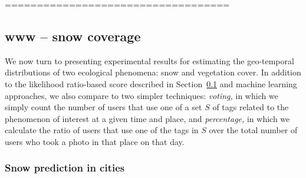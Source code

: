 
\hfill \break
\hfill \break
===================================
\hfill \break
\hfill \break
\subsection{www -- snow coverage}

\label{sec:results}

We now turn to presenting experimental results for estimating the
geo-temporal distributions of two ecological phenomena: snow and vegetation cover.
In addition to the likelihood ratio-based score described in
Section~\ref{sec:results} and machine learning approaches, we also
compare to two simpler techniques: \textit{voting,} in which 
we simply count the number of users that use one of a set
$S$ of tags related to the phenomenon of interest at a given time and place, and
\textit{percentage,} in which we calculate the ratio of users that use
one of the tags in $S$ over the total number of users who took a photo
in that place on that day.

\subsubsection*{Snow prediction in cities}






